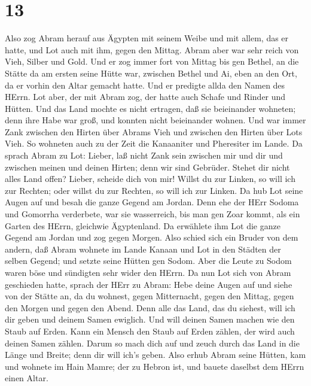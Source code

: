 \hypertarget{section-12}{%
\section{13}\label{section-12}}

 Also zog Abram herauf aus Ägypten mit seinem Weibe und mit
allem, das er hatte, und Lot auch mit ihm, gegen den Mittag.
 Abram aber war sehr reich von Vieh, Silber und Gold.
 Und er zog immer fort von Mittag bis gen Bethel, an die
Stätte da am ersten seine Hütte war, zwischen Bethel und Ai,
 eben an den Ort, da er vorhin den Altar gemacht hatte. Und
er predigte allda den Namen des HErrn.  Lot aber, der mit
Abram zog, der hatte auch Schafe und Rinder und Hütten.  Und
das Land mochte es nicht ertragen, daß sie beieinander wohneten; denn
ihre Habe war groß, und konnten nicht beieinander wohnen. 
Und war immer Zank zwischen den Hirten über Abrams Vieh und zwischen den
Hirten über Lots Vieh. So wohneten auch zu der Zeit die Kanaaniter und
Pheresiter im Lande.  Da sprach Abram zu Lot: Lieber, laß
nicht Zank sein zwischen mir und dir und zwischen meinen und deinen
Hirten; denn wir sind Gebrüder.  Stehet dir nicht alles Land
offen? Lieber, scheide dich von mir! Willst du zur Linken, so will ich
zur Rechten; oder willst du zur Rechten, so will ich zur Linken.
 Da hub Lot seine Augen auf und besah die ganze Gegend am
Jordan. Denn ehe der HErr Sodoma und Gomorrha verderbete, war sie
wasserreich, bis man gen Zoar kommt, als ein Garten des HErrn, gleichwie
Ägyptenland.  Da erwählete ihm Lot die ganze Gegend am
Jordan und zog gegen Morgen. Also schied sich ein Bruder von dem andern,
 daß Abram wohnete im Lande Kanaan und Lot in den Städten
der selben Gegend; und setzte seine Hütten gen Sodom.  Aber
die Leute zu Sodom waren böse und sündigten sehr wider den HErrn.
 Da nun Lot sich von Abram geschieden hatte, sprach der
HErr zu Abram: Hebe deine Augen auf und siehe von der Stätte an, da du
wohnest, gegen Mitternacht, gegen den Mittag, gegen den Morgen und gegen
den Abend.  Denn alle das Land, das du siehest, will ich
dir geben und deinem Samen ewiglich.  Und will deinen Samen
machen wie den Staub auf Erden. Kann ein Mensch den Staub auf Erden
zählen, der wird auch deinen Samen zählen.  Darum so mach
dich auf und zeuch durch das Land in die Länge und Breite; denn dir will
ich's geben.  Also erhub Abram seine Hütten, kam und
wohnete im Hain Mamre; der zu Hebron ist, und bauete daselbst dem HErrn
einen Altar.

